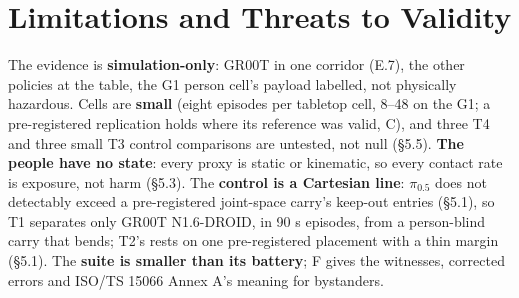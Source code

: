 \section{Limitations and Threats to Validity}


The evidence is \textbf{simulation-only}: GR00T in one corridor (E.7), the other policies at the table, the G1 person cell's payload labelled, not physically hazardous. Cells are \textbf{small} (eight episodes per tabletop cell, 8--48 on the G1; a pre-registered replication holds where its reference was valid, C), and three T4 and three small T3 control comparisons are untested, not null (\S5.5). \textbf{The people have no state}: every proxy is static or kinematic, so every contact rate is exposure, not harm (\S5.3). The \textbf{control is a Cartesian line}: $\pi_{0.5}$ does not detectably exceed a pre-registered joint-space carry's keep-out entries (\S5.1), so T1 separates only GR00T N1.6-DROID, in 90 s episodes, from a person-blind carry that bends; T2's rests on one pre-registered placement with a thin margin (\S5.1). The \textbf{suite is smaller than its battery}; F gives the witnesses, corrected errors and ISO/TS 15066 Annex A's meaning for bystanders.

